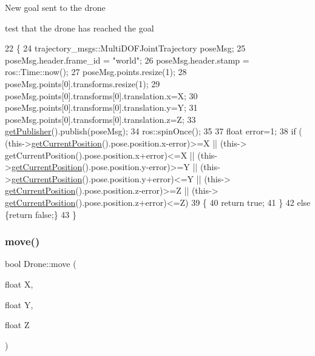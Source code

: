 New goal sent to the drone

test that the drone has reached the goal 
\begin{DoxyCode}
22 \{
24     trajectory\_msgs::MultiDOFJointTrajectory poseMsg;
25         poseMsg.header.frame\_id = \textcolor{stringliteral}{"world"};
26     poseMsg.header.stamp = ros::Time::now();
27         poseMsg.points.resize(1);
28         poseMsg.points[0].transforms.resize(1);
29         poseMsg.points[0].transforms[0].translation.x=X;
30         poseMsg.points[0].transforms[0].translation.y=Y;
31     poseMsg.points[0].transforms[0].translation.z=Z;
33     \hyperlink{classDrone_aac0983a112b0b3f75c0e625bcba3a330}{getPublisher}().publish(poseMsg);
34     ros::spinOnce();
35 
37     \textcolor{keywordtype}{float} error=1;
38     \textcolor{keywordflow}{if} ( (this->\hyperlink{classDrone_a0113e8f3a3f438113dca0d77c065276b}{getCurrentPosition}().pose.position.x-error)>=X || (this->
      getCurrentPosition().pose.position.x+error)<=X || (this->\hyperlink{classDrone_a0113e8f3a3f438113dca0d77c065276b}{getCurrentPosition}().pose.position.y-error)>=Y ||
       (this->\hyperlink{classDrone_a0113e8f3a3f438113dca0d77c065276b}{getCurrentPosition}().pose.position.y+error)<=Y || (this->
      \hyperlink{classDrone_a0113e8f3a3f438113dca0d77c065276b}{getCurrentPosition}().pose.position.z-error)>=Z || (this->
      \hyperlink{classDrone_a0113e8f3a3f438113dca0d77c065276b}{getCurrentPosition}().pose.position.z+error)<=Z)
39         \{   
40             \textcolor{keywordflow}{return} \textcolor{keyword}{true};
41         \}
42     \textcolor{keywordflow}{else} \{\textcolor{keywordflow}{return} \textcolor{keyword}{false};\}    
43 \}
\end{DoxyCode}
\mbox{\label{classDrone_a106284f63c05f3f112435b2cb5c4896c}} 
\subsubsection{\texorpdfstring{move()}{move()}\hspace{0.1cm}{\footnotesize\ttfamily [2/2]}}
{\footnotesize\ttfamily bool Drone\+::move (\begin{DoxyParamCaption}\item[{float}]{X,  }\item[{float}]{Y,  }\item[{float}]{Z }\end{DoxyParamCaption})}

